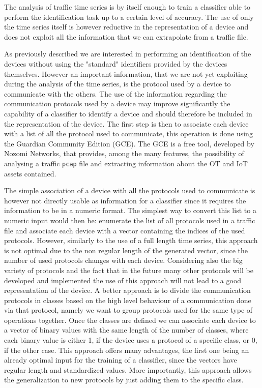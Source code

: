 The analysis of traffic time series is by itself enough to train a classifier able to perform the identification task up to a certain level of accuracy. The use of only the time series itself is however reductive in the representation of a device and does not exploit all the information that we can extrapolate from a traffic file.

As previously described we are interested in performing an identification of the devices without using the "standard" identifiers provided by the devices themselves. However an important information, that we are not yet exploiting during the analysis of the time series, is the protocol used by a device to communicate with the others.
The use of the information regarding the communication protocols used by a device may improve significantly the capability of a classifier to identify a device and should therefore be included in the representation of the device.
The first step is then to associate each device with a list of all the protocol used to communicate, this operation is done using the Guardian Community Edition (GCE)\cite{gce}. The GCE is a free tool, developed by Nozomi Networks\cite{nozomi}, that provides, among the many features, the possibility of analysing a traffic \texttt{pcap} file and extracting information about the OT and IoT assets contained. 

The simple association of a device with all the protocols used to communicate is however not directly usable as information for a classifier since it requires the information to be in a numeric format.
The simplest way to convert this list to a numeric input would then be: enumerate the list of all protocols used in a traffic file and associate each device with a vector containing the indices of the used protocols. However, similarly to the use of a full length time series, this approach is not optimal due to the non regular length of the generated vector, since the number of used protocols changes with each device. Considering also the big variety of protocols and the fact that in the future many other protocols will be developed and implemented the use of this approach will not lead to a good representation of the device.
A better approach is to divide the communication protocols in classes based on the high level behaviour of a communication done via that protocol, namely we want to group protocols used for the same type of operations together. Once the classes are defined we can associate each device to a vector of binary values with the same length of the number of classes, where each binary value is either 1, if the device uses a protocol of a specific class, or 0, if the other case. This approach offers many advantages, the first one being an already optimal input for the training of a classifier, since the vectors have regular length and standardized values. More importantly, this approach allows the generalization to new protocols by just adding them to the specific class.

